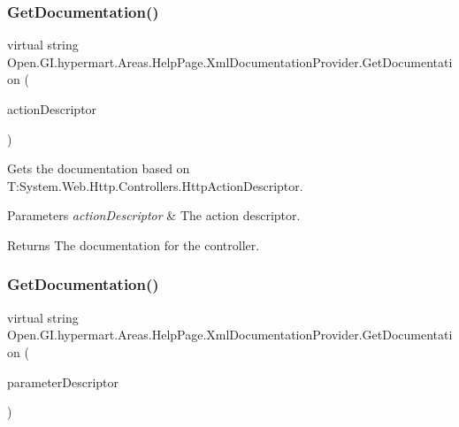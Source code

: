 \subsubsection{\texorpdfstring{Get\+Documentation()}{GetDocumentation()}\hspace{0.1cm}{\footnotesize\ttfamily [2/5]}}
{\footnotesize\ttfamily virtual string Open.\+G\+I.\+hypermart.\+Areas.\+Help\+Page.\+Xml\+Documentation\+Provider.\+Get\+Documentation (\begin{DoxyParamCaption}\item[{Http\+Action\+Descriptor}]{action\+Descriptor }\end{DoxyParamCaption})\hspace{0.3cm}{\ttfamily [virtual]}}



Gets the documentation based on T\+:\+System.\+Web.\+Http.\+Controllers.\+Http\+Action\+Descriptor. 


\begin{DoxyParams}{Parameters}
{\em action\+Descriptor} & The action descriptor.\\
\hline
\end{DoxyParams}
\begin{DoxyReturn}{Returns}
The documentation for the controller. 
\end{DoxyReturn}
\hypertarget{class_open_1_1_g_i_1_1hypermart_1_1_areas_1_1_help_page_1_1_xml_documentation_provider_a765e1ebc7e331274a664dd0edba7660c}{}\label{class_open_1_1_g_i_1_1hypermart_1_1_areas_1_1_help_page_1_1_xml_documentation_provider_a765e1ebc7e331274a664dd0edba7660c} 
\subsubsection{\texorpdfstring{Get\+Documentation()}{GetDocumentation()}\hspace{0.1cm}{\footnotesize\ttfamily [3/5]}}
{\footnotesize\ttfamily virtual string Open.\+G\+I.\+hypermart.\+Areas.\+Help\+Page.\+Xml\+Documentation\+Provider.\+Get\+Documentation (\begin{DoxyParamCaption}\item[{Http\+Parameter\+Descriptor}]{parameter\+Descriptor }\end{DoxyParamCaption})\hspace{0.3cm}{\ttfamily [virtual]}}



